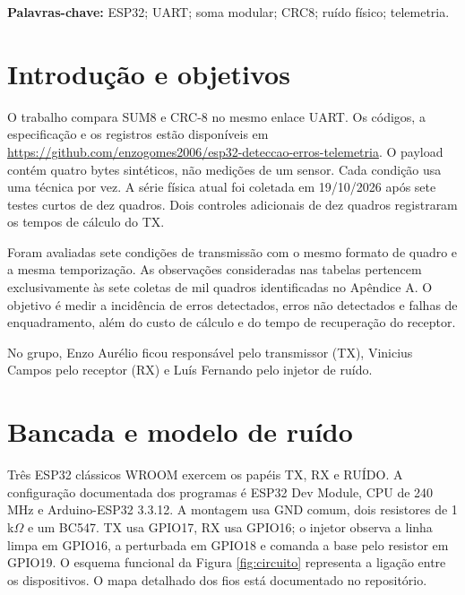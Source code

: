 \documentclass[12pt,a4paper]{article}
\begin{document}
\par\noindent\textbf{Palavras-chave:} ESP32; UART; soma modular; CRC8; ruído físico; telemetria.\par

\clearpage\tableofcontents\clearpage{}

\section{Introdução e objetivos}

O trabalho compara SUM8 e CRC-8 no mesmo enlace UART. Os códigos, a especificação e os registros estão disponíveis em \url{https://github.com/enzogomes2006/esp32-deteccao-erros-telemetria}. O payload contém quatro bytes sintéticos, não medições de um sensor. Cada condição usa uma técnica por vez. A série física atual foi coletada em 19/10/2026 após sete testes curtos de dez quadros. Dois controles adicionais de dez quadros registraram os tempos de cálculo do TX.\par

Foram avaliadas sete condições de transmissão com o mesmo formato de quadro e a mesma temporização. As observações consideradas nas tabelas pertencem exclusivamente às sete coletas de mil quadros identificadas no Apêndice A. O objetivo é medir a incidência de erros detectados, erros não detectados e falhas de enquadramento, além do custo de cálculo e do tempo de recuperação do receptor.\par

No grupo, Enzo Aurélio ficou responsável pelo transmissor (TX), Vinicius Campos pelo receptor (RX) e Luís Fernando pelo injetor de ruído.\par

\section{Bancada e modelo de ruído}

Três ESP32 clássicos WROOM exercem os papéis TX, RX e RUÍDO. A configuração documentada dos programas é ESP32 Dev Module, CPU de 240 MHz e Arduino-ESP32 3.3.12. A montagem usa GND comum, dois resistores de 1 k\ensuremath{\Omega} e um BC547. TX usa GPIO17, RX usa GPIO16; o injetor observa a linha limpa em GPIO16, a perturbada em GPIO18 e comanda a base pelo resistor em GPIO19. O esquema funcional da Figura \ref{fig:circuito} representa a ligação entre os dispositivos. O mapa detalhado dos fios está documentado no repositório.\par
\end{document}
